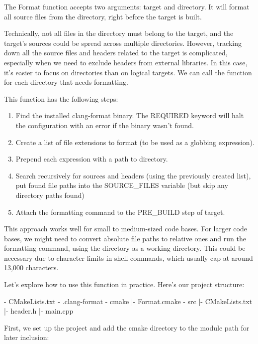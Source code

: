 The Format function accepts two arguments: target and directory. It will format all source files from the directory, right before the target is built.

Technically, not all files in the directory must belong to the target, and the target’s sources could be spread across multiple directories. However, tracking down all the source files and headers related to the target is complicated, especially when we need to exclude headers from external libraries. In this case, it’s easier to focus on directories than on logical targets. We can call the function for each directory that needs formatting.

This function has the following steps:

\begin{enumerate}
\item
Find the installed clang-format binary. The REQUIRED keyword will halt the configuration with an error if the binary wasn’t found.

\item
Create a list of file extensions to format (to be used as a globbing expression).

\item
Prepend each expression with a path to directory.

\item
Search recursively for sources and headers (using the previously created list), put found file paths into the SOURCE\_FILES variable (but skip any directory paths found)

\item
Attach the formatting command to the PRE\_BUILD step of target.
\end{enumerate}

This approach works well for small to medium-sized code bases. For larger code bases, we might need to convert absolute file paths to relative ones and run the formatting command, using the directory as a working directory. This could be necessary due to character limits in shell commands, which usually cap at around 13,000 characters.

Let’s explore how to use this function in practice. Here’s our project structure:

\begin{shell}
- CMakeLists.txt
- .clang-format
- cmake
  |- Format.cmake
- src
  |- CMakeLists.txt
  |- header.h
  |- main.cpp
\end{shell}

First, we set up the project and add the cmake directory to the module path for later inclusion:

